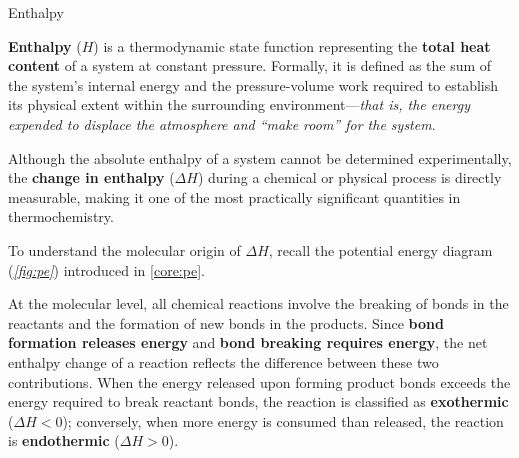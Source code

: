 \documentclass[10pt]{article}
\begin{document}
    \begin{core}[label=core:enthalpy]{Enthalpy}

      \textbf{Enthalpy} ($H$) is a thermodynamic state function representing the \textbf{total heat content} of a system at constant pressure. Formally, it is defined as the sum of the system's internal energy and the pressure-volume work required to establish its physical extent within the surrounding environment---\textit{that is, the energy expended to displace the atmosphere and ``make room'' for the system}.

      Although the absolute enthalpy of a system cannot be determined experimentally, the \textbf{change in enthalpy} ($\Delta H$) during a chemical or physical process is directly measurable, making it one of the most practically significant quantities in thermochemistry.

      To understand the molecular origin of $\Delta H$, recall the potential energy diagram (\textit{\autoref{fig:pe}}) introduced in \autoref{core:pe}.

      At the molecular level, all chemical reactions involve the breaking of bonds in the reactants and the formation of new bonds in the products. Since \textbf{bond formation releases energy} and \textbf{bond breaking requires energy}, the net enthalpy change of a reaction reflects the difference between these two contributions. When the energy released upon forming product bonds exceeds the energy required to break reactant bonds, the reaction is classified as \textbf{exothermic} ($\Delta H < 0$); conversely, when more energy is consumed than released, the reaction is \textbf{endothermic} ($\Delta H > 0$).

    \end{core}
\end{document}
